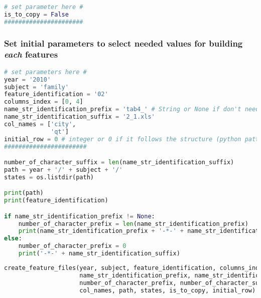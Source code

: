\begin{lstlisting}[language=Python]
# set parameter here #
is_to_copy = False
######################
\end{lstlisting}

\hypertarget{set-initial-parameters-to-select-needed-values-for-building-each-features}{%
\subsubsection{\texorpdfstring{Set initial parameters to select needed
values for building \emph{each}
features}{Set initial parameters to select needed values for building each features}}\label{set-initial-parameters-to-select-needed-values-for-building-each-features}}

\begin{lstlisting}[language=Python]
# set parameters here #
year = '2010'
subject = 'family'
feature_identification = '02'
columns_index = [0, 4]
name_str_identification_prefix = 'tab4_' # String or None if don't need a suffix to search
name_str_identification_suffix = '2_1.xls'
col_names = ['city',
             'qt']
initial_row = 0 # integer or 0 if it follows the structure (python pattern)
#######################

number_of_character_suffix = len(name_str_identification_suffix)
path = year + '/' + subject + '/'
states = os.listdir(path)

print(path)
print(feature_identification)

if name_str_identification_prefix != None:
    number_of_character_prefix = len(name_str_identification_prefix)
    print(name_str_identification_prefix + '-*-' + name_str_identification_suffix)
else:
    number_of_character_prefix = 0
    print('-*-' + name_str_identification_suffix)
\end{lstlisting}

\begin{lstlisting}[language=Python]
create_feature_files(year, subject, feature_identification, columns_index, 
                     name_str_identification_prefix, name_str_identification_suffix,
                     number_of_character_prefix, number_of_character_suffix,
                     col_names, path, states, is_to_copy, initial_row)
\end{lstlisting}
